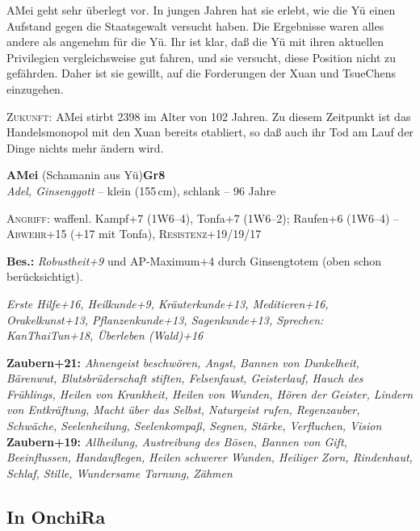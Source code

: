 \documentclass[
a4paper,
twoside,
DIV=calc,
BCOR=4mm,
fontsize=9pt,
twocolumn=on,
titlepage=on,
parskip=half
]{scrartcl}
\begin{document}
AMei geht sehr überlegt vor. In jungen Jahren hat sie erlebt, wie die
Yü einen Aufstand gegen die Staatsgewalt versucht haben. Die
Ergebnisse waren alles andere als angenehm für die Yü. Ihr ist klar,
daß die Yü mit ihren aktuellen Privilegien vergleichsweise gut fahren,
und sie versucht, diese Position nicht zu gefährden. Daher ist sie
gewillt, auf die Forderungen der Xuan und TsueChens einzugehen.

\textsc{Zukunft:} AMei stirbt 2398 im Alter von 102 Jahren. Zu diesem
Zeitpunkt ist das Handelsmonopol mit den Xuan bereits etabliert, so
daß auch ihr Tod am Lauf der Dinge nichts mehr ändern wird.

\textbf{AMei} (Schamanin aus Yü)\hfill \textbf{Gr8}\\
\emph{Adel, Ginsenggott} -- klein (155\,cm), schlank -- 96 Jahre


\textsc{Angriff:} waffenl. Kampf+7 (1W6--4), Tonfa+7 (1W6--2); Raufen+6
(1W6--4) -- \textsc{Abwehr}+15 (+17 mit Tonfa),
\textsc{Resistenz}+19/19/17

\textbf{Bes.:} \emph{Robustheit+9} und AP-Maximum+4 durch Ginsengtotem
(oben schon berücksichtigt).

\emph{Erste Hilfe+16, Heilkunde+9, Kräuterkunde+13, Meditieren+16,
  Orakelkunst+13, Pflanzenkunde+13, Sagenkunde+13, Sprechen:
  KanThaiTun+18, Überleben (Wald)+16}

\textbf{Zaubern+21:} \emph{Ahnengeist beschwören, Angst, Bannen von
  Dunkelheit, Bärenwut, Blutsbrüderschaft stiften, Felsenfaust,
  Geisterlauf, Hauch des Frühlings, Heilen von Krankheit, Heilen von
  Wunden, Hören der Geister, Lindern von Entkräftung, Macht über das
  Selbst, Naturgeist rufen, Regenzauber, Schwäche, Seelenheilung,
  Seelenkompaß, Segnen, Stärke, Verfluchen, Vision}\\
\textbf{Zaubern+19:} \emph{Allheilung, Austreibung des Bösen, Bannen
  von Gift, Beeinflussen, Handauflegen, Heilen schwerer Wunden,
  Heiliger Zorn, Rindenhaut, Schlaf, Stille, Wundersame Tarnung,
  Zähmen}

\subsection{In OnchiRa}
\end{document}
